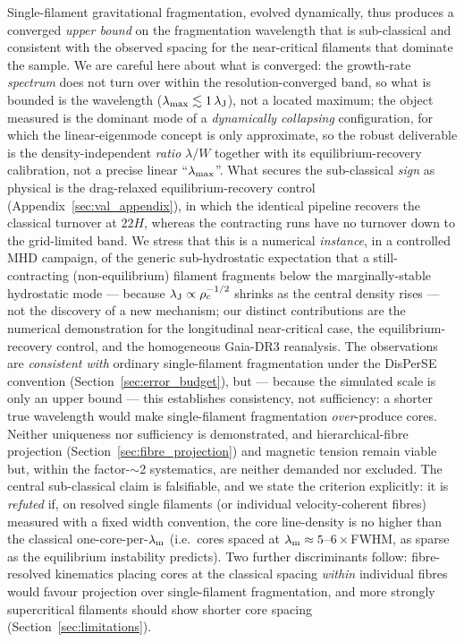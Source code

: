 \documentclass[usenatbib,twoside,twocolumn]{mnras}
\begin{document}
Single-filament gravitational fragmentation, evolved dynamically, thus produces a converged \emph{upper bound} on the fragmentation wavelength that is sub-classical and consistent with the observed spacing for the near-critical filaments that dominate the sample. We are careful here about what is converged: the growth-rate \emph{spectrum} does not turn over within the resolution-converged band, so what is bounded is the wavelength ($\lambda_{\rm max}\lesssim1\,\lambda_{\rm J}$), not a located maximum; the object measured is the dominant mode of a \emph{dynamically collapsing} configuration, for which the linear-eigenmode concept is only approximate, so the robust deliverable is the density-independent \emph{ratio} $\lambda/W$ together with its equilibrium-recovery calibration, not a precise linear ``$\lambda_{\rm max}$''. What secures the sub-classical \emph{sign} as physical is the drag-relaxed equilibrium-recovery control (Appendix~\ref{sec:val_appendix}), in which the identical pipeline recovers the classical turnover at $22H$, whereas the contracting runs have no turnover down to the grid-limited band. We stress that this is a numerical \emph{instance}, in a controlled MHD campaign, of the generic sub-hydrostatic expectation that a still-contracting (non-equilibrium) filament fragments below the marginally-stable hydrostatic mode \citep{Clarke2016,Clarke2017,Clarke2020} --- because $\lambda_{\rm J}\propto\rho_c^{-1/2}$ shrinks as the central density rises --- not the discovery of a new mechanism; our distinct contributions are the numerical demonstration for the longitudinal near-critical case, the equilibrium-recovery control, and the homogeneous Gaia-DR3 reanalysis. The observations are \emph{consistent with} ordinary single-filament fragmentation under the DisPerSE convention (Section~\ref{sec:error_budget}), but --- because the simulated scale is only an upper bound --- this establishes consistency, not sufficiency: a shorter true wavelength would make single-filament fragmentation \emph{over}-produce cores. Neither uniqueness nor sufficiency is demonstrated, and hierarchical-fibre projection (Section~\ref{sec:fibre_projection}) and magnetic tension remain viable but, within the factor-$\sim$2 systematics, are neither demanded nor excluded. The central sub-classical claim is falsifiable, and we state the criterion explicitly: it is \emph{refuted} if, on resolved single filaments (or individual velocity-coherent fibres) measured with a fixed width convention, the core line-density is no higher than the classical one-core-per-$\lambda_{\rm m}$ (i.e.\ cores spaced at $\lambda_{\rm m}\approx5$--$6\times$FWHM, as sparse as the equilibrium instability predicts). Two further discriminants follow: fibre-resolved kinematics placing cores at the classical spacing \emph{within} individual fibres would favour projection over single-filament fragmentation, and more strongly supercritical filaments should show shorter core spacing (Section~\ref{sec:limitations}).
\end{document}
